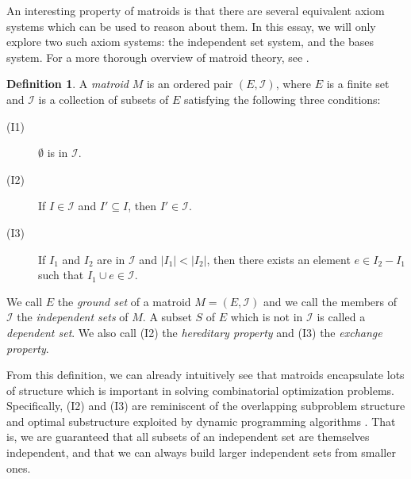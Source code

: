 \documentclass[a4paper,11pt]{report}
\theoremstyle{plain}
\theoremstyle{definition}
\newtheorem{defn}[defn]{Definition}
\newcommand{\I}{\mathcal{I}}
\begin{document}
An interesting property of matroids is that there are several equivalent
axiom systems which can be used to reason about them. In this essay, we
will only explore two such axiom systems: the independent set system, and
the bases system. For a more thorough overview of matroid theory, see
\cite{matroid-theory}.

\begin{defn}
A \emph{matroid} $M$ is an ordered pair $(E, \I)$, where $E$ is a finite
set and $\I$ is a collection of subsets of $E$ satisfying the
following three conditions:
\begin{description}
    \item[(I1)] $\emptyset$ is in $\I$.
    \item[(I2)] If $I \in \I$ and $I' \subseteq I$, then $I' \in
                \I$.
    \item[(I3)] If $I_1$ and $I_2$ are in $\I$ and $|I_1| < |I_2|$,
                then there exists an element $e \in I_2 - I_1$ such that
                $I_1 \cup e \in \I$.
\end{description}
\end{defn}

We call $E$ the \emph{ground set} of a matroid $M = (E, \I)$ and we call
the members of $\I$ the \emph{independent sets} of $M$. A subset $S$ of $E$
which is not in $\I$ is called a \emph{dependent set}. We also call (I2)
the \emph{hereditary property} and (I3) the \emph{exchange property}.

From this definition, we can already intuitively see that matroids
encapsulate lots of structure which is important in solving combinatorial
optimization problems. Specifically, (I2) and (I3) are reminiscent of the
overlapping subproblem structure and optimal substructure exploited by
dynamic programming algorithms \cite{clrs}. That is, we are guaranteed
that all subsets of an independent set are themselves independent, and that
we can always build larger independent sets from smaller ones.
\end{document}
